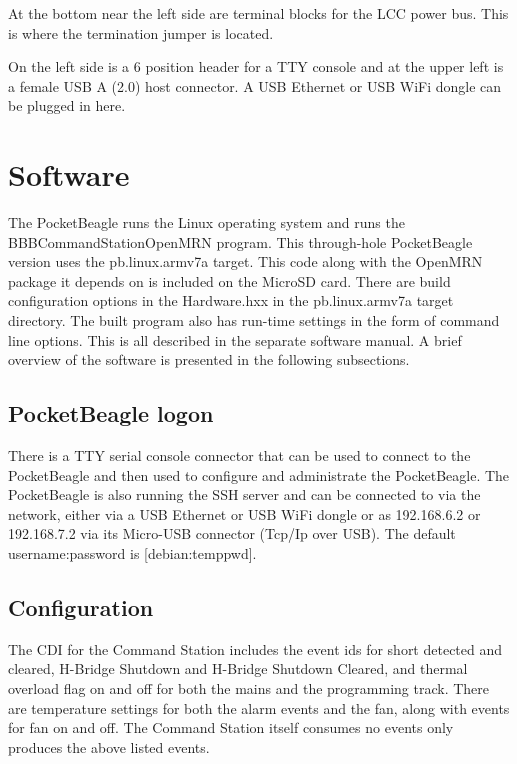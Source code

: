 At the bottom near the left side are terminal blocks for the LCC power bus.  
This is where the termination jumper is located.

On the left side is a 6 position header for a TTY console and at the upper 
left is a female USB A (2.0) host connector.  A USB Ethernet or USB WiFi 
dongle can be plugged in here.

\section{Software}

The PocketBeagle runs the Linux operating system and runs the
BBBCommandStationOpenMRN program. This through-hole PocketBeagle version uses
the pb.linux.armv7a target. This code along with the OpenMRN package it
depends on is included on the MicroSD card. There are build configuration
options in the Hardware.hxx in the pb.linux.armv7a target directory. The built
program also has run-time settings in the form of command line options. This
is all described in the separate software manual. A brief overview of the
software is presented in the following subsections.

\subsection{PocketBeagle logon}

There is a TTY serial console connector that can be used to connect to the 
PocketBeagle and then used to configure and administrate the PocketBeagle. The 
PocketBeagle is also running the SSH server and can be connected to via the 
network, either via a  USB Ethernet or USB WiFi dongle or as 192.168.6.2 or 
192.168.7.2 via its Micro-USB connector (Tcp/Ip over USB).  The default 
username:password is [debian:temppwd].

\subsection{Configuration}

The CDI for the Command Station includes the event ids for short detected and 
cleared, H-Bridge Shutdown and H-Bridge Shutdown Cleared, and thermal overload 
flag on and off for both the mains and the programming track.  There are 
temperature settings for both the alarm events and the fan, along with events 
for fan on and off.  The Command Station itself consumes no events only 
produces the above listed events.

